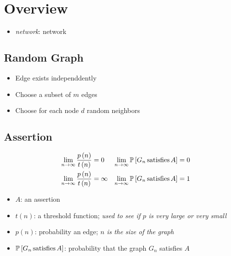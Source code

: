 \chapter{Overview}

\begin{itemize}
  \item \emph{\Gls{network}}: \glsdesc{network}
\end{itemize}

\section{Random Graph}

  \begin{itemize}
    \item Edge exists independdently
    \item Choose a subset of $ m $ edges
    \item Choose for each node $ d $ random neighbors
  \end{itemize}

\section{Assertion}

  \begin{align}
    \lim_{n \to \infty} \frac{p\left( n \right)}{t\left( n \right)} &= 0 &
    \lim_{n \to \infty}\mathbb{P}\left[ G_{n} \operatorname{satisfies} A \right] &= 0 \\
    \lim_{n \to \infty} \frac{p\left( n \right)}{t\left( n \right)} &= \infty &
    \lim_{n \to \infty}\mathbb{P}\left[ G_{n} \operatorname{satisfies} A \right] &= 1
  \end{align}

  \begin{itemize}
    \item $ A $: an assertion
    \item $ t\left( n \right) $: a threshold function; \emph{used to see
    if $ p $ is very large or very small}
    \item $ p\left( n \right) $: probability an edge; \emph{$ n $ is the size
    of the graph}
    \item $ \mathbb{P}\left[ G_{n} \operatorname{satisfies} A \right] $: probability that
    the graph $ G_{n} $ satisfies $ A $
  \end{itemize}

